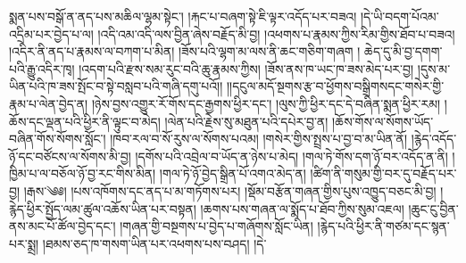 སྨན་པས་བསྒོ་ན་ནད་པས་མཆིལ་ལྷམ་སྟེང་། །རྐང་པ་བཞག་སྟེ་ཇི་ལྟར་འདོད་པར་བཟའ། །དེ་ཡི་བདག་པོའམ་འདྲིམ་པར་བྱེད་པ་ལ། །འདི་འམ་འདི་ལས་བྱིན་ཞེས་བརྗོད་མི་བྱ། །འཕགས་པ་རྣམས་ཀྱིས་རིམ་གྱིས་ཐོབ་པ་བཟའ། །འདིར་ནི་ནད་པ་རྣམས་ལ་བཀག་པ་མིན། །ཟོས་པའི་ལྷག་མ་ལས་ནི་ཆང་གཅིག་གཞག ། ཆེད་དུ་མི་བྱ་དགག་པའི་རྒྱུ་འདིར་ཁྭ། །འདག་པའི་རྫས་སམ་རུང་བའི་ཆུ་རྣམས་ཀྱིས། །ཟོས་ནས་ཁ་ཡང་ཁ་ཟས་མེད་པར་བྱ། །དུས་མ་ཡིན་པའི་ཁ་ཟས་སྤོང་བ་སྟེ་བསླབ་པའི་གཞི་དགུ་པའོ།། །།དངུལ་མདོ་སྔགས་རྩ་བ་ཕྱོགས་བསྒྲིགསདང་གསེར་གྱི་རྣམ་པ་ལེན་བྱེད་ན། །ཉེས་བྱས་འགྱུར་རོ་གོས་དང་རྒྱགས་ཕྱིར་དང་། །ལུས་ཀྱི་ཕྱིར་དང་དེ་བཞིན་སྨན་ཕྱིར་རམ། །ཆོས་དང་ལྡན་པའི་ཕྱིར་ནི་ལྟུང་བ་མེད། །ལེན་པའི་རྗེས་སུ་མཐུན་པའི་དཔེར་བྱ་ན། །ཆོས་གོས་ལ་སོགས་ཡོད་བཞིན་གོས་སོགས་སློང་། །ཁབ་རལ་བ་སོ་རུས་ལ་སོགས་པའམ། །གསེར་གྱིས་སྤྲས་པ་བྱ་བ་མ་ཡིན་ནོ། །རྙེད་འདོད་ཉོ་དང་བཙོངས་ལ་སོགས་མི་བྱ། །དགོས་པའི་འབྲེལ་བ་ཡོད་ན་ཉེས་པ་མེད། །གལ་ཏེ་གོས་དག་ཉོ་བར་འདོད་ན་ནི། །ཁྱིམ་པ་ལ་བཅོལ་ཉོ་བྱ་རང་གིས་མིན། །གལ་ཏེ་ཉོ་བྱེད་སྒྲིན་པོ་འགའ་མེད་ན། །ཚིག་ནི་གསུམ་གྱི་བར་དུ་བརྗོད་པར་བྱ། །རྒས་༄༅། །པས་འཁོགས་དང་ནད་པ་མ་གཏོགས་པར། །སྡོམ་བརྩོན་གཞན་གྱིས་པུས་འཁྱུད་བཅང་མི་བྱ། །རྙེད་ཕྱིར་སྤྱོད་ལམ་ཚུལ་འཆོས་ཡིན་པར་བསྟན། །ཆགས་པས་གཞན་ལ་སྨོད་པ་ཐོབ་ཀྱིས་སུམ་འཇལ། །ཆུང་ངུ་བྱིན་ནས་མང་པོ་ཚོལ་བྱེད་དང་། །གཞན་གྱི་བསྔགས་པ་བྱེད་པ་གཞོགས་སློང་ཡིན། །རྙེད་པའི་ཕྱིར་ནི་གཙམ་དང་སྙན་པར་སྨྲ། །ཐམས་ཅད་ཁ་གསག་ཡིན་པར་འཕགས་པས་བཤད། །དེ་%
